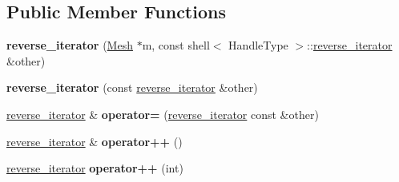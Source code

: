 \subsection*{Public Member Functions}
\begin{DoxyCompactItemize}
\item 
\hypertarget{classINMOST_1_1Storage_1_1reference__array_1_1reverse__iterator_a2a8f7c0ad04bb4c642b9e16582076d64}{{\bfseries reverse\-\_\-iterator} (\hyperlink{classINMOST_1_1Mesh}{Mesh} $\ast$m, const shell$<$ Handle\-Type $>$\-::\hyperlink{classINMOST_1_1Storage_1_1reference__array_1_1reverse__iterator}{reverse\-\_\-iterator} \&other)}\label{classINMOST_1_1Storage_1_1reference__array_1_1reverse__iterator_a2a8f7c0ad04bb4c642b9e16582076d64}

\item 
\hypertarget{classINMOST_1_1Storage_1_1reference__array_1_1reverse__iterator_abe9465a93095e80e2247aad718b1bdd6}{{\bfseries reverse\-\_\-iterator} (const \hyperlink{classINMOST_1_1Storage_1_1reference__array_1_1reverse__iterator}{reverse\-\_\-iterator} \&other)}\label{classINMOST_1_1Storage_1_1reference__array_1_1reverse__iterator_abe9465a93095e80e2247aad718b1bdd6}

\item 
\hypertarget{classINMOST_1_1Storage_1_1reference__array_1_1reverse__iterator_ab91cad1582e0bb72352b9c437eed15d1}{\hyperlink{classINMOST_1_1Storage_1_1reference__array_1_1reverse__iterator}{reverse\-\_\-iterator} \& {\bfseries operator=} (\hyperlink{classINMOST_1_1Storage_1_1reference__array_1_1reverse__iterator}{reverse\-\_\-iterator} const \&other)}\label{classINMOST_1_1Storage_1_1reference__array_1_1reverse__iterator_ab91cad1582e0bb72352b9c437eed15d1}

\item 
\hypertarget{classINMOST_1_1Storage_1_1reference__array_1_1reverse__iterator_a59d86ffeb0a194b1be6535c881d9f772}{\hyperlink{classINMOST_1_1Storage_1_1reference__array_1_1reverse__iterator}{reverse\-\_\-iterator} \& {\bfseries operator++} ()}\label{classINMOST_1_1Storage_1_1reference__array_1_1reverse__iterator_a59d86ffeb0a194b1be6535c881d9f772}

\item 
\hypertarget{classINMOST_1_1Storage_1_1reference__array_1_1reverse__iterator_ac8021b73c7aa98d35b0cf0ba44752e78}{\hyperlink{classINMOST_1_1Storage_1_1reference__array_1_1reverse__iterator}{reverse\-\_\-iterator} {\bfseries operator++} (int)}\label{classINMOST_1_1Storage_1_1reference__array_1_1reverse__iterator_ac8021b73c7aa98d35b0cf0ba44752e78}


\end{DoxyCompactItemize}
